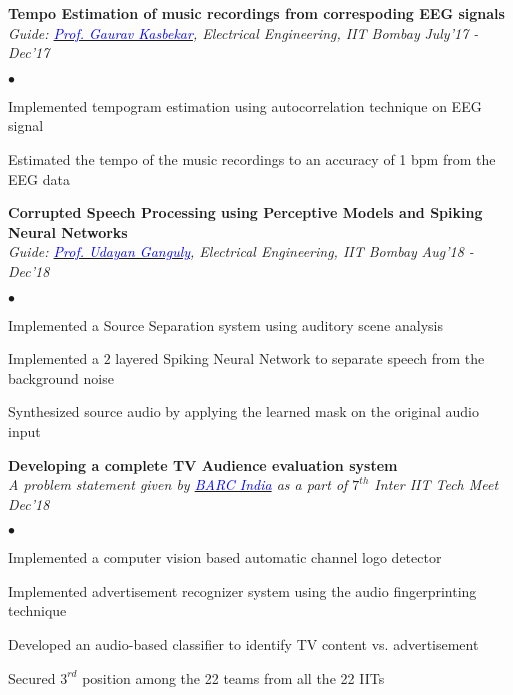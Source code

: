 \documentclass[margin,line, 9pt]{res}
\newenvironment{list2}{
  \begin{list}{$\bullet$}{%
      \setlength{\itemsep}{0.03in}
      \setlength{\parsep}{0in} \setlength{\parskip}{0in}
      \setlength{\topsep}{0in} \setlength{\partopsep}{0in} 
      \setlength{\leftmargin}{0.2in}}}{\end{list}}
\begin{document}
\begin{resume}
{\bf Tempo Estimation of music recordings from correspoding EEG signals} \\
{\em Guide: \href{https://www.ee.iitb.ac.in/~gskasbekar/}{\textcolor{blue}{Prof. Gaurav Kasbekar}}, Electrical Engineering, IIT Bombay} \hfill {\it July'17 - Dec'17}\\
\vspace*{-.13in}
\begin{list2}
\item Implemented tempogram estimation using autocorrelation technique on EEG signal
\item Estimated the tempo of the music recordings to an accuracy of 1 bpm from the EEG data
\end{list2}

{\bf Corrupted Speech Processing using Perceptive Models and Spiking Neural Networks} \\
{\em Guide: \href{https://www.ee.iitb.ac.in/wiki/faculty/udayan}{\textcolor{blue}{Prof. Udayan Ganguly}}, Electrical Engineering, IIT Bombay} \hfill {\it Aug'18 - Dec'18}\\
\vspace*{-.13in}
\begin{list2}
\item Implemented a Source Separation system using auditory scene analysis
\item Implemented a $2$ layered Spiking Neural Network to separate speech from the background noise
\item Synthesized source audio by applying the learned mask on the original audio input
\end{list2}




{\bf Developing a complete TV Audience evaluation system} \\
{\em A problem statement given by \href{https://www.barcindia.co.in}{\textcolor{blue}{BARC India}} as a part of $7^{th}$ Inter IIT Tech Meet} \hfill {\it Dec'18}\\
\vspace*{-.13in}
\begin{list2}
\item Implemented a computer vision based automatic channel logo detector
\item Implemented advertisement recognizer system using the audio fingerprinting technique
\item Developed an audio-based classifier to identify TV content vs. advertisement
\item Secured $3^{rd}$ position among the 22 teams from all the 22 IITs
\end{list2}



\end{resume}
\end{document}
